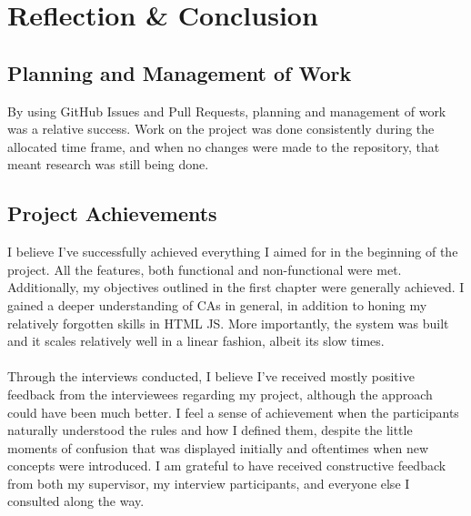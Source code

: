 \chapter{Reflection \& Conclusion}
\section{Planning and Management of Work}
By using GitHub Issues and Pull Requests, planning and management of work was a relative success. Work on the project was done consistently during the allocated time frame, and when no changes were made to the repository, that meant research was still being done. 

\section{Project Achievements}
I believe I've successfully achieved everything I aimed for in the beginning of the project. All the features, both functional and non-functional were met. Additionally, my objectives outlined in the first chapter were generally achieved. I gained a deeper understanding of CAs in general, in addition to honing my relatively forgotten skills in HTML JS. More importantly, the system was built and it scales relatively well in a linear fashion, albeit its slow times. 
\\ \\
Through the interviews conducted, I believe I've received mostly positive feedback from the interviewees regarding my project, although the approach could have been much better. I feel a sense of achievement when the participants naturally understood the rules and how I defined them, despite the little moments of confusion that was displayed initially and oftentimes when new concepts were introduced. I am grateful to have received constructive feedback from both my supervisor, my interview participants, and everyone else I consulted along the way. 

